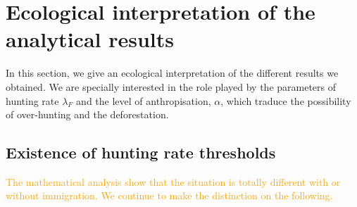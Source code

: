 \documentclass{article}
\newcommand{\lfw}{\lambda_{F}}
\newcommand{\lfw}{\lambda_{F}}
\newcommand{\vdeux}[1]{\textcolor{orange}{#1}}
\theoremstyle{definition}
\theoremstyle{remark}
\begin{document}
\section{Ecological interpretation of the analytical results} \label{sec:ecological}
In this section, we give an ecological interpretation of the different results we obtained. We are specially interested in the role played by the parameters of hunting rate $\lfw$ and the level of anthropisation, $\alpha$, which traduce the possibility of over-hunting and the deforestation. 

\subsection{Existence of hunting rate thresholds}
\vdeux{
The mathematical analysis show that the situation is totally different with or without immigration. We continue to make the distinction on the following.}
\end{document}
